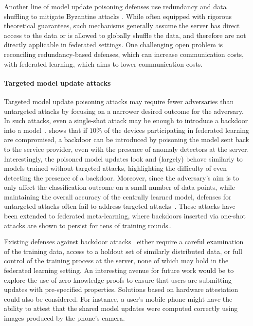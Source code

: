 Another line of model update poisoning defenses use redundancy and data shuffling to mitigate Byzantine attacks \citep{chen18draco, rajput2019detox, data2019data}. While often equipped with rigorous theoretical guarantees, such mechanisms generally assume the server has direct access to the data or is allowed to globally shuffle the data, and therefore are not directly applicable in federated settings. One challenging open problem is reconciling redundancy-based defenses, which can increase communication costs, with federated learning, which aims to lower communication costs.

\paragraph{Targeted model update attacks} Targeted model update poisoning attacks may require fewer adversaries than untargeted attacks by focusing on a narrower desired outcome for the adversary. In such attacks, even a single-shot attack may be enough to introduce a backdoor into a model~\citep{bagdasaryan18backdoor}. \citet{pmlr-v97-bhagoji19a} shows that if $10\%$ of the devices participating in federated learning are compromised, a backdoor can be introduced by poisoning the model sent back to the service provider, even with the presence of anomaly detectors at the server. Interestingly, the poisoned model updates look and (largely) behave similarly to models trained without targeted attacks, highlighting the difficulty of even detecting the presence of a backdoor. Moreover, since the adversary's aim is to only affect the classification outcome on a small number of data points, while maintaining the overall accuracy of the centrally learned model, defenses for untargeted attacks often fail to address targeted attacks~\citep{pmlr-v97-bhagoji19a,bagdasaryan18backdoor}. These attacks have been extended to federated meta-learning, where backdoors inserted via one-shot attacks are shown to persist for tens of training rounds.\cite{chen2020backdoor}.

Existing defenses against backdoor attacks~\citep{steinhardt2017certified, liu2018fine, tran2018spectral, pmlr-v97-diakonikolas19a, wang2019neural, pmlr-v97-shen19e, chou2018sentinet} either require a careful examination of the training data, access to a holdout set of similarly distributed data, or full control of the training process at the server, none of which may hold in the federated learning setting. An interesting avenue for future work would be to explore the use of zero-knowledge proofs to ensure that users are submitting updates with pre-specified properties. Solutions based on hardware attestation could also be considered. For instance, a user's mobile phone might have the ability to attest that the shared model updates were computed correctly using images produced by the phone's camera.

